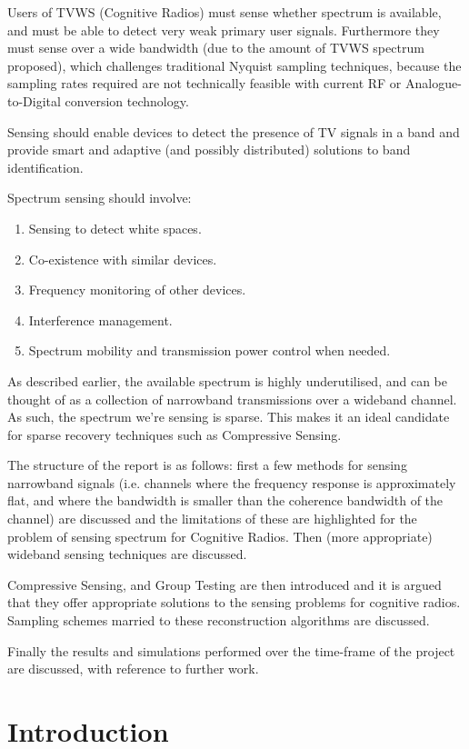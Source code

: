 Users of TVWS (Cognitive Radios) must sense whether spectrum is available, and must be able to detect very weak primary user signals. Furthermore they must sense over a wide bandwidth (due to the amount of TVWS spectrum proposed), which challenges traditional Nyquist sampling techniques, because the sampling rates required are not technically feasible with current RF or Analogue-to-Digital conversion technology.

Sensing should enable devices to detect the presence of TV signals in a band and provide smart and adaptive (and possibly distributed) solutions to band identification.

Spectrum sensing should involve:

\begin{enumerate}
\item Sensing to detect white spaces.
\item Co-existence with similar devices.
\item Frequency monitoring of other devices.
\item Interference management. 
\item Spectrum mobility and transmission power control when needed.
\end{enumerate}

As described earlier, the available spectrum is highly underutilised, and can be thought of as a collection of narrowband transmissions over a wideband channel. As such, the spectrum we're sensing is sparse. This makes it an ideal candidate for sparse recovery techniques such as Compressive Sensing.  

The structure of the report is as follows: first a few methods for sensing narrowband signals (i.e. channels where the frequency response is approximately flat, and where the bandwidth is smaller than the coherence bandwidth of the channel) are discussed and the limitations of these are highlighted for the problem of sensing spectrum for Cognitive Radios. Then (more appropriate) wideband sensing techniques are discussed. 

Compressive Sensing, and Group Testing are then introduced and it is argued that they offer appropriate solutions to the sensing problems for cognitive radios. Sampling schemes married to these reconstruction algorithms are discussed. 

Finally the results and simulations performed over the time-frame of the project are discussed, with reference to further work. 

\section{Introduction}

